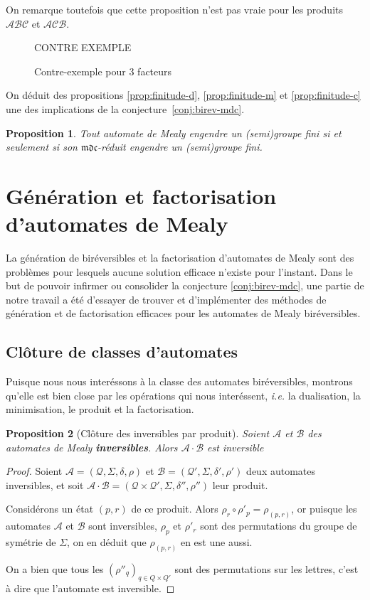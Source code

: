 \documentclass[11pt,a4paper]{article}
\newtheorem{prop}{Proposition}
\begin{document}
On remarque toutefois que cette proposition n'est pas vraie pour les produits $\mathcal{ABC}$ et $\mathcal{ACB}$.

\begin{figure}[h!]
  CONTRE EXEMPLE
  \caption{Contre-exemple pour 3 facteurs}
\end{figure}

On déduit des propositions \ref{prop:finitude-d}, \ref{prop:finitude-m} et \ref{prop:finitude-c} une des implications de la conjecture~\ref{conj:birev-mdc}.

\begin{prop}
  Tout automate de Mealy engendre un (semi)groupe fini si et seulement si son $\mathfrak{mdc}$-réduit engendre un (semi)groupe fini.
\end{prop}

\section{Génération et factorisation d'automates de Mealy}
La génération de biréversibles et la factorisation d'automates de Mealy sont des problèmes pour lesquels aucune solution efficace n'existe pour l'instant. Dans le but de pouvoir infirmer ou consolider la conjecture \ref{conj:birev-mdc}, une partie de notre travail a été d'essayer de trouver et d'implémenter des méthodes de génération et de factorisation efficaces pour les automates de Mealy biréversibles.


\subsection{Clôture de classes d'automates\label{sec:cloture}}

Puisque nous nous interéssons à la classe des automates biréversibles, montrons qu'elle est bien close par les opérations qui nous interéssent, \emph{i.e.} la dualisation, la minimisation, le produit et la factorisation.

\begin{prop}[Clôture des inversibles par produit]
  Soient $\mathcal{A}$ et $\mathcal{B}$ des automates de Mealy \textbf{inversibles}. Alors $\mathcal{A}\cdot\mathcal{B}$ est inversible
\end{prop}

\begin{proof}
  Soient $\mathcal{A}=\left(\mathcal{Q}, \Sigma, \delta, \rho\right)$ et $\mathcal{B}=\left(\mathcal{Q'}, \Sigma, \delta', \rho'\right)$ deux automates inversibles, et soit $\mathcal{A\cdot B}=\left(\mathcal{Q\times Q'}, \Sigma, \delta'', \rho''\right)$ leur produit.


  Considérons un état $(p, r)$ de ce produit. Alors $\rho_r\circ\rho'_p=\rho_{(p,r)}$, or puisque les automates $\mathcal{A}$ et $\mathcal{B}$ sont inversibles, $\rho_p$ et $\rho'_r$ sont des permutations du groupe de symétrie de $\Sigma$, on en déduit que $\rho_{(p, r)}$ en est une aussi.

  On a bien que tous les ${(\rho''_q)}_{q\in Q\times Q'}$ sont des permutations sur les lettres, c'est à dire que l'automate est inversible.
\end{proof}
\end{document}
